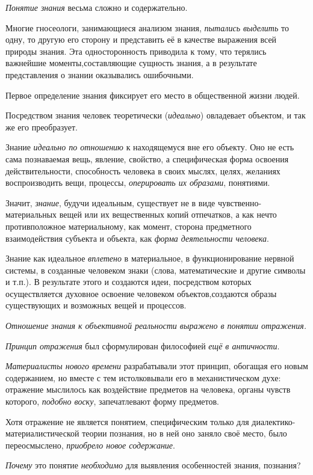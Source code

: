\documentclass[a4paper,14pt,russian]{extreport}
\begin{document}
\emph{Понятие знания} весьма сложно и содержательно.

Многие гносеологи, занимающиеся анализом знания, \emph{пытались выделить} то одну, то другую его сторону и представить её в качестве выражения всей природы знания. Эта односторонность приводила к тому, что терялись важнейшие моменты,составляющие сущность знания, а в результате представления о знании оказывались ошибочными.

Первое определение знания фиксирует его место в общественной жизни людей.

Посредством знания человек теоретически (\emph{идеально}) овладевает объектом, и так же его преобразует.

Знание \emph{идеально по отношению} к находящемуся вне его объекту. Оно не есть сама познаваемая вещь, явление, свойство, а специфическая форма освоения действительности, способность человека в своих мыслях, целях, желаниях воспроизводить вещи, процессы, \emph{оперировать их образами}, понятиями.

Значит, \emph{знание}, будучи идеальным, существует не в виде чувственно-материальных вещей или их вещественных копий отпечатков, а как нечто противположное материальному, как момент, сторона предметного взаимодействия субъекта и объекта, как \emph{форма деятельности человека}.

Знание как идеальное \emph{вплетено} в материальное, в функционирование нервной системы, в созданные человеком знаки (слова, математические и другие символы и т.п.). В результате этого и создаются идеи, посредством которых осуществляется духовное освоение человеком объектов,создаются образы существующих и возможных вещей и процессов.

\emph{Отношение знания к объективной реальности выражено в понятии отражения.}

\emph{Принцип отражения} был сформулирован философией \emph{ещё в античности}.

\emph{Материалисты нового времени} разрабатывали этот принцип, обогащая его новым содержанием, но вместе с тем истолковывали его в механистическом духе: отражение мыслилось как воздействие предметов на человека, органы чувств которого, \emph{подобно воску}, запечатлевают форму предметов.

Хотя отражение не является понятием, специфическим только для диалектико-материалистической теории познания, но в ней оно заняло своё место, было переосмыслено, \emph{приобрело новое содержание}.

\emph{Почему} это понятие \emph{необходимо} для выявления особенностей знания, познания?
\end{document}
